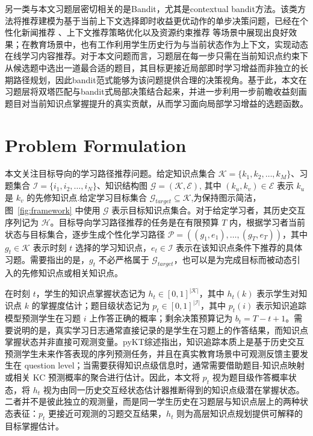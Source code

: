 \documentclass[11pt,a4paper]{article}
\begin{document}
另一类与本文习题层密切相关的是Bandit，尤其是contextual bandit方法。该类方法将推荐建模为基于当前上下文选择即时收益更优动作的单步决策问题，已经在个性化新闻推荐 \cite{li2010contextual}、上下文推荐策略优化\cite{pan2019policy}以及资源约束推荐 \cite{yang2020hierarchical}等场景中展现出良好效果；在教育场景中，也有工作利用学生历史行为与当前状态作为上下文，实现动态在线学习内容推荐\cite{intayoad2020reinforcement,kubotani2021rltutor}。对于本文问题而言，习题层在每一步只需在当前知识点约束下从候选题中选出一道最合适的题目，其目标更接近局部即时学习增益而非独立的长期路径规划，因此bandit范式能够为该问题提供合理的决策视角。基于此，本文在习题层将双塔匹配与bandit式局部决策结合起来，并进一步利用一步前瞻收益刻画题目对当前知识点掌握提升的真实贡献，从而学习面向局部学习增益的选题函数。
\section{Problem Formulation}

本文关注目标导向的学习路径推荐问题。给定知识点集合 $\mathcal{K}=\{k_1,k_2,\dots,k_M\}$、习题集合 $\mathcal{I}=\{i_1,i_2,\dots,i_N\}$、知识结构图 $\mathcal{G}=(\mathcal{K},\mathcal{E})$, 其中 $(k_u,k_v)\in\mathcal{E}$ 表示 $k_u$ 是 $k_v$ 的先修知识点.给定学习目标集合 $\mathcal{G}_{target}\subseteq\mathcal{K}$,为保持图示简洁，图~\ref{fig:framework} 中使用 $\mathcal{G}$ 表示目标知识点集合。对于给定学习者，其历史交互序列记为 $\mathcal{H}$。目标导向学习路径推荐的任务是在有限预算 $T$ 内，根据学习者当前状态与目标集合，逐步生成个性化学习路径 $\mathcal{P}=((g_1,e_1),\dots,(g_T,e_T))$，其中 $g_t\in\mathcal{K}$ 表示时刻 $t$ 选择的学习知识点，$e_t\in\mathcal{I}$ 表示在该知识点条件下推荐的具体习题。需要指出的是，$g_t$ 不必严格属于 $\mathcal{G}_{target}$，也可以是为完成目标而被动态引入的先修知识点或相关知识点。

在时刻 $t$，学生的知识点掌握状态记为 $h_t\in[0,1]^{|\mathcal{K}|}$，其中 $h_t(k)$ 表示学生对知识点 $k$ 的掌握度估计；题目级状态记为 $p_t\in[0,1]^{|\mathcal{I}|}$，其中 $p_t(i)$ 表示知识追踪模型预测学生在习题 $i$ 上作答正确的概率；剩余决策预算记为 $b_t=T-t+1$。需要说明的是，真实学习日志通常直接记录的是学生在习题上的作答结果，而知识点掌握状态并非直接可观测变量。pyKT综述\cite{liu2025deep}指出，知识追踪本质上是基于历史交互预测学生未来作答表现的序列预测任务，并且在真实教育场景中可观测反馈主要发生在 question level；当需要获得知识点级信息时，通常需要借助题目-知识点映射或相关 KC 预测概率的聚合进行估计。因此，本文将 $p_t$ 视为题目级作答概率状态，将 $h_t$ 视为由同一历史交互经状态估计器推断得到的知识点级潜在掌握状态。二者并不是彼此独立的观测量，而是同一学生历史在习题层与知识点层上的两种状态表征：$p_t$ 更接近可观测的习题交互结果，$h_t$ 则为高层知识点规划提供可解释的目标掌握估计。
\end{document}
